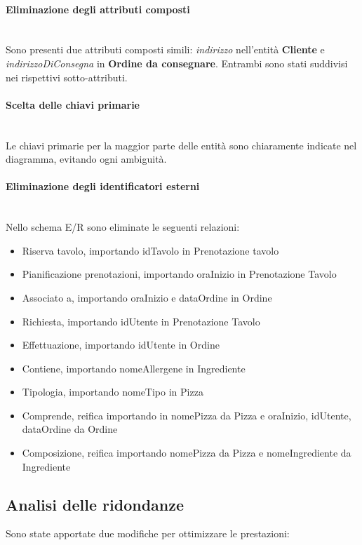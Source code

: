 \documentclass[a4paper,12pt, oneside]{article}
\begin{document}
\paragraph{Eliminazione degli attributi composti}
\hphantom{A}\\    %
Sono presenti due attributi composti simili: \textit{indirizzo}
nell'entità \textbf{Cliente} e \textit{indirizzoDiConsegna} in
\textbf{Ordine da consegnare}. Entrambi sono stati suddivisi
nei rispettivi sotto-attributi.

\paragraph{Scelta delle chiavi primarie}
\hphantom{A}\\    %
Le chiavi primarie per la maggior parte delle entità sono
chiaramente indicate nel diagramma, evitando ogni ambiguità.

\paragraph{Eliminazione degli identificatori esterni}
\hphantom{A}\\    %
Nello schema E/R sono eliminate le seguenti relazioni:
\begin{itemize}
    \item Riserva tavolo, importando idTavolo in Prenotazione tavolo
    \item Pianificazione prenotazioni, importando oraInizio in Prenotazione Tavolo
    \item Associato a, importando oraInizio e dataOrdine in Ordine
    \item Richiesta, importando idUtente in Prenotazione Tavolo
    \item Effettuazione, importando idUtente in Ordine
    \item Contiene, importando nomeAllergene in Ingrediente
    \item Tipologia, importando nomeTipo in Pizza
    \item Comprende, reifica importando in nomePizza da Pizza e oraInizio, idUtente, dataOrdine da Ordine
    \item Composizione, reifica importando nomePizza da Pizza e nomeIngrediente da Ingrediente
\end{itemize}

\subsection{Analisi delle ridondanze}
Sono state apportate due modifiche per ottimizzare le prestazioni:
\end{document}
